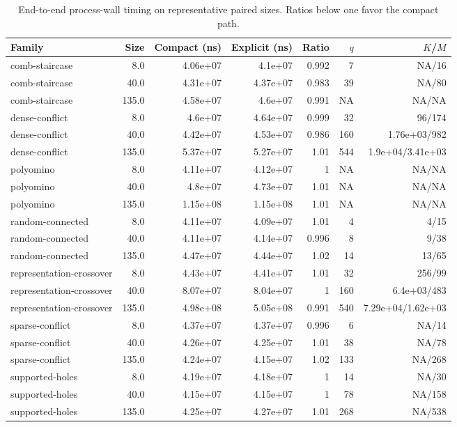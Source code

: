 \begin{table}[t]
\caption{End-to-end process-wall timing on representative paired sizes. Ratios below one favor the compact path.}
\label{tab:paper-scaling-timing}
\begin{tabular}{lrrrrrr}
\toprule
Family & Size & Compact (ns) & Explicit (ns) & Ratio & $q$ & $K$/$M$ \\
\midrule
comb-staircase & 8.0 & 4.06e+07 & 4.1e+07 & 0.992 & 7 & NA/16 \\
comb-staircase & 40.0 & 4.31e+07 & 4.37e+07 & 0.983 & 39 & NA/80 \\
comb-staircase & 135.0 & 4.58e+07 & 4.6e+07 & 0.991 & NA & NA/NA \\
dense-conflict & 8.0 & 4.6e+07 & 4.64e+07 & 0.999 & 32 & 96/174 \\
dense-conflict & 40.0 & 4.42e+07 & 4.53e+07 & 0.986 & 160 & 1.76e+03/982 \\
dense-conflict & 135.0 & 5.37e+07 & 5.27e+07 & 1.01 & 544 & 1.9e+04/3.41e+03 \\
polyomino & 8.0 & 4.11e+07 & 4.12e+07 & 1 & NA & NA/NA \\
polyomino & 40.0 & 4.8e+07 & 4.73e+07 & 1.01 & NA & NA/NA \\
polyomino & 135.0 & 1.15e+08 & 1.15e+08 & 1.01 & NA & NA/NA \\
random-connected & 8.0 & 4.11e+07 & 4.09e+07 & 1.01 & 4 & 4/15 \\
random-connected & 40.0 & 4.11e+07 & 4.14e+07 & 0.996 & 8 & 9/38 \\
random-connected & 135.0 & 4.47e+07 & 4.44e+07 & 1.02 & 14 & 13/65 \\
representation-crossover & 8.0 & 4.43e+07 & 4.41e+07 & 1.01 & 32 & 256/99 \\
representation-crossover & 40.0 & 8.07e+07 & 8.04e+07 & 1 & 160 & 6.4e+03/483 \\
representation-crossover & 135.0 & 4.98e+08 & 5.05e+08 & 0.991 & 540 & 7.29e+04/1.62e+03 \\
sparse-conflict & 8.0 & 4.37e+07 & 4.37e+07 & 0.996 & 6 & NA/14 \\
sparse-conflict & 40.0 & 4.26e+07 & 4.25e+07 & 1.01 & 38 & NA/78 \\
sparse-conflict & 135.0 & 4.24e+07 & 4.15e+07 & 1.02 & 133 & NA/268 \\
supported-holes & 8.0 & 4.19e+07 & 4.18e+07 & 1 & 14 & NA/30 \\
supported-holes & 40.0 & 4.15e+07 & 4.15e+07 & 1 & 78 & NA/158 \\
supported-holes & 135.0 & 4.25e+07 & 4.27e+07 & 1.01 & 268 & NA/538 \\
\bottomrule
\end{tabular}
\end{table}

